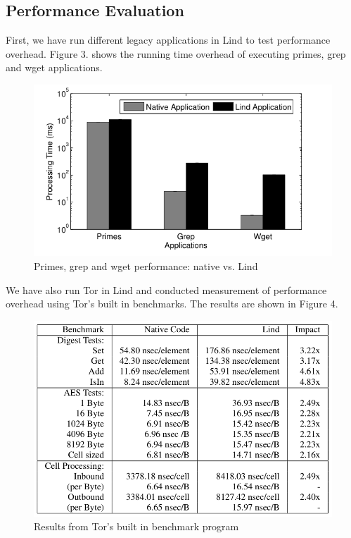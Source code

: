 \subsection{Performance Evaluation}

\par
First, we have run different legacy applications in Lind to test performance overhead. Figure 3. shows the running time overhead of executing primes, grep and wget applications. 


\begin{figure}[h]
\centering
\includegraphics[width=1.0\columnwidth]{diagram/evaluation_01.png}
\caption{Primes, grep and wget performance: native vs. Lind}
\label{fig:arch}
\end{figure}


\par
We have also run Tor in Lind and conducted measurement of performance overhead using Tor's built in benchmarks. The results are shown in Figure 4.


\begin{figure}[h]
\centering
\includegraphics[width=0.9\columnwidth]{diagram/evaluation_02.png}
\caption{Results from Tor's built in benchmark program}
\label{fig:arch}
\end{figure}


